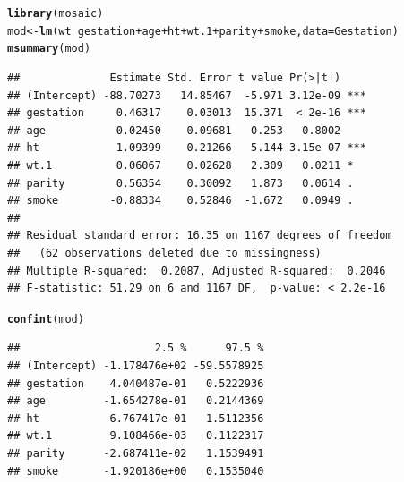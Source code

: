 \documentclass[10pt]{article}\usepackage[]{graphicx}\usepackage[]{color}
\makeatletter
\newcommand{\hlopt}[1]{\textcolor[rgb]{0,0,0}{#1}}%
\newcommand{\hlstd}[1]{\textcolor[rgb]{0.345,0.345,0.345}{#1}}%
\newcommand{\hlkwb}[1]{\textcolor[rgb]{0.69,0.353,0.396}{#1}}%
\newcommand{\hlkwc}[1]{\textcolor[rgb]{0.333,0.667,0.333}{#1}}%
\newcommand{\hlkwd}[1]{\textcolor[rgb]{0.737,0.353,0.396}{\textbf{#1}}}%
\newenvironment{kframe}{%
 \def\at@end@of@kframe{}%
 \ifinner\ifhmode%
  \def\at@end@of@kframe{\end{minipage}}%
  \begin{minipage}{\columnwidth}%
 \fi\fi%
 \def\FrameCommand##1{\hskip\@totalleftmargin \hskip-\fboxsep
 \colorbox{shadecolor}{##1}\hskip-\fboxsep
     \hskip-\linewidth \hskip-\@totalleftmargin \hskip\columnwidth}%
 \MakeFramed {\advance\hsize-\width
   \@totalleftmargin\z@ \linewidth\hsize
   \@setminipage}}%
 {\par\unskip\endMakeFramed%
 \at@end@of@kframe}
\newenvironment{knitrout}{}{} %
\makeatother
\begin{document}
\begin{knitrout}\footnotesize
{}\color{fgcolor}\begin{kframe}
\begin{alltt}
\hlkwd{library}\hlstd{(mosaic)}
\hlstd{mod} \hlkwb{<-} \hlkwd{lm}\hlstd{(wt} \hlopt{~} \hlstd{gestation} \hlopt{+} \hlstd{age} \hlopt{+} \hlstd{ht} \hlopt{+} \hlstd{wt.1} \hlopt{+} \hlstd{parity} \hlopt{+} \hlstd{smoke,} \hlkwc{data} \hlstd{= Gestation)}
\hlkwd{msummary}\hlstd{(mod)}
\end{alltt}
\begin{verbatim}
##              Estimate Std. Error t value Pr(>|t|)    
## (Intercept) -88.70273   14.85467  -5.971 3.12e-09 ***
## gestation     0.46317    0.03013  15.371  < 2e-16 ***
## age           0.02450    0.09681   0.253   0.8002    
## ht            1.09399    0.21266   5.144 3.15e-07 ***
## wt.1          0.06067    0.02628   2.309   0.0211 *  
## parity        0.56354    0.30092   1.873   0.0614 .  
## smoke        -0.88334    0.52846  -1.672   0.0949 .  
## 
## Residual standard error: 16.35 on 1167 degrees of freedom
##   (62 observations deleted due to missingness)
## Multiple R-squared:  0.2087,	Adjusted R-squared:  0.2046 
## F-statistic: 51.29 on 6 and 1167 DF,  p-value: < 2.2e-16
\end{verbatim}
\begin{alltt}
\hlkwd{confint}\hlstd{(mod)}
\end{alltt}
\begin{verbatim}
##                     2.5 %      97.5 %
## (Intercept) -1.178476e+02 -59.5578925
## gestation    4.040487e-01   0.5222936
## age         -1.654278e-01   0.2144369
## ht           6.767417e-01   1.5112356
## wt.1         9.108466e-03   0.1122317
## parity      -2.687411e-02   1.1539491
## smoke       -1.920186e+00   0.1535040
\end{verbatim}
\end{kframe}
\end{knitrout}
\end{document}
